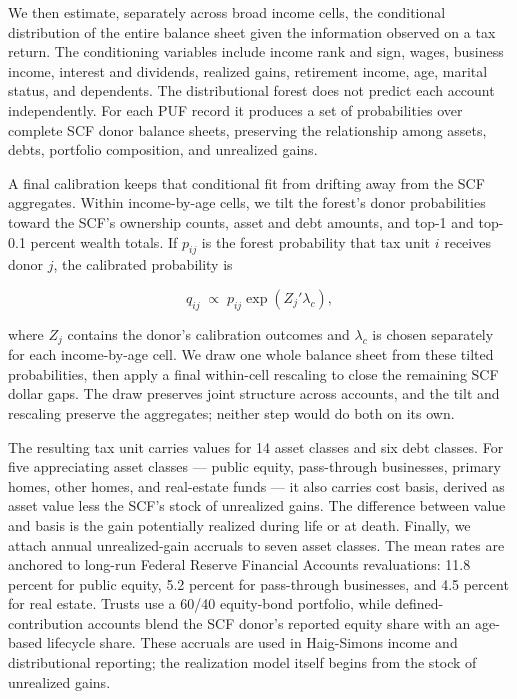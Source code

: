 \documentclass[10pt,twocolumn]{article}
\begin{document}
We then estimate, separately across broad income cells, the conditional
distribution of the entire balance sheet given the information observed
on a tax return. The conditioning variables include income rank and
sign, wages, business income, interest and dividends, realized gains,
retirement income, age, marital status, and dependents. The
distributional forest does not predict each account independently. For
each PUF record it produces a set of probabilities over complete SCF
donor balance sheets, preserving the relationship among assets, debts,
portfolio composition, and unrealized gains.

A final calibration keeps that conditional fit from drifting away from
the SCF aggregates. Within income-by-age cells, we tilt the forest's
donor probabilities toward the SCF's ownership counts, asset and debt
amounts, and top-1 and top-0.1 percent wealth totals. If \(p_{ij}\) is
the forest probability that tax unit \(i\) receives donor \(j\), the
calibrated probability is

\[
q_{ij} \;\propto\; p_{ij}\exp(Z_j'\lambda_c),
\]

where \(Z_j\) contains the donor's calibration outcomes and
\(\lambda_c\) is chosen separately for each income-by-age cell. We draw
one whole balance sheet from these tilted probabilities, then apply a
final within-cell rescaling to close the remaining SCF dollar gaps. The draw preserves joint structure across accounts, and the tilt and rescaling
preserve the aggregates; neither step would do both on its own.

The resulting tax unit carries values for 14 asset classes and six debt
classes. For five appreciating asset classes --- public equity,
pass-through businesses, primary homes, other homes, and real-estate
funds --- it also carries cost basis, derived as asset value less the
SCF's stock of unrealized gains. The difference between value and basis
is the gain potentially realized during life or at death. Finally, we
attach annual unrealized-gain accruals to seven asset classes. The mean
rates are anchored to long-run Federal Reserve Financial Accounts
revaluations: 11.8 percent for public equity, 5.2 percent for
pass-through businesses, and 4.5 percent for real estate. Trusts use a
60/40 equity-bond portfolio, while defined-contribution accounts blend
the SCF donor's reported equity share with an age-based lifecycle share.
These accruals are used in Haig-Simons income and distributional
reporting; the realization model itself begins from the stock of
unrealized gains.
\end{document}
